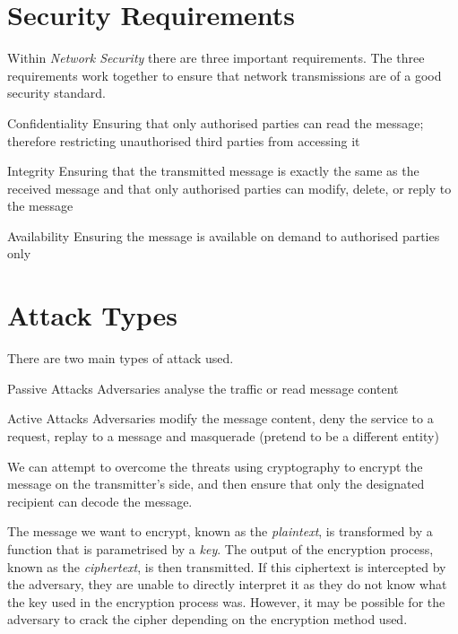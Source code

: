 
\section{Security Requirements}
Within \textit{Network Security} there are three important requirements. The three requirements work together to ensure that network transmissions are of a good security standard.
\begin{define}
\item[Confidentiality] Ensuring that only authorised parties can read the message; therefore restricting unauthorised third parties from accessing it
\item[Integrity] Ensuring that the transmitted message is exactly the same as the received message and that only authorised parties can modify, delete, or reply to the message
\item[Availability] Ensuring the message is available on demand to authorised parties only
\end{define}

\section{Attack Types}
There are two main types of attack used.

\begin{define}
\item[Passive Attacks] Adversaries analyse the traffic or read message content
\item[Active Attacks] Adversaries modify the message content, deny the service to a request, replay to a message and masquerade (pretend to be a different entity) 
\end{define}

We can attempt to overcome the threats using cryptography to encrypt the message on the transmitter's side, and then ensure that only the designated recipient can decode the message.

The message we want to encrypt, known as the \textit{plaintext}, is transformed by a function that is parametrised by a \textit{key}. The output of the encryption process, known as the \textit{ciphertext}, is then transmitted. If this ciphertext is intercepted by the adversary, they are unable to directly interpret it as they do not know what the key used in the encryption process was. However, it may be possible for the adversary to crack the cipher depending on the encryption method used.

